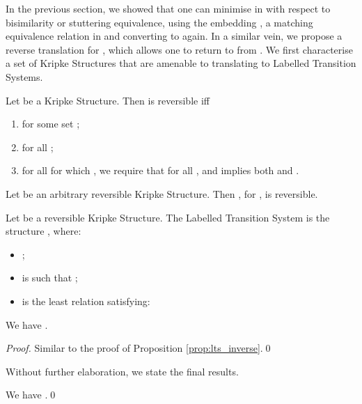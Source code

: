 \documentclass{llncs}
\begin{document}
In the previous section, we showed that one can minimise in \KS
with respect to bisimilarity or stuttering equivalence,
using the embedding , a matching equivalence relation in \LTS and
converting to \KS again. In a similar vein, we propose a reverse
translation for , which allows one to return to \LTS from
\KS. We first characterise a set of Kripke Structures that are amenable
to translating to Labelled Transition Systems.

\begin{definition} Let  be a Kripke
Structure. Then  is reversible iff
\begin{enumerate}
\item  for some set ;
\item  for all ;
\item for all  for which , we require that
for all ,  and  implies both  and
.

\end{enumerate}

\end{definition}
\begin{proposition}
\label{prop:reversibility2}
Let  be an arbitrary reversible Kripke Structure.
Then , for ,
is reversible.

\end{proposition}

\begin{definition}
Let  be a reversible Kripke Structure.
The Labelled Transition System  is the structure
, where:
\begin{itemize}
\item ;

\item  is such that ;

\item  is the least relation satisfying:


\end{itemize}
\end{definition}
\begin{proposition}
\label{prop:ks_inverse}
We have .
\end{proposition}

\begin{proof}
Similar to the proof of Proposition \ref{prop:lts_inverse}.\qed
\end{proof}

\noindent
Without further elaboration, we state the final results.
\begin{theorem}
\label{th:lts2ks_bisim_minimal}
We have .\qed
\end{theorem}
\end{document}
